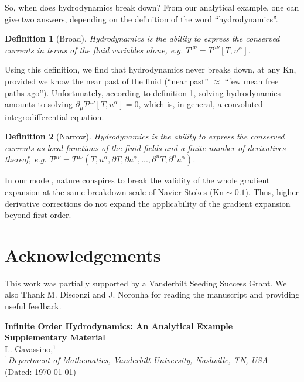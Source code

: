 \documentclass[a4paper, amsfonts, amssymb, amsmath, reprint, showkeys, twoside,notitlepage]{revtex4-2}
\newcommand{\Kn}{\text{Kn}}
\newtheorem{definition}{Definition}
\begin{document}
So, when does hydrodynamics break down? From our analytical example, one can give two answers, depending on the definition of the word ``hydrodynamics''.
\begin{definition}[Broad]\label{Broad}
Hydrodynamics is the ability to express the conserved currents in terms of the fluid variables alone, e.g. $T^{\mu \nu}=T^{\mu \nu}[T,u^\alpha]$.
\end{definition}
Using this definition, we find that hydrodynamics never breaks down, at any $\Kn$, provided we know the near past of the fluid (``near past'' $\approx$ ``few mean free paths ago''). Unfortunately, according to definition \ref{Broad}, solving hydrodynamics amounts to solving $\partial_\mu T^{\mu \nu}[T,u^\alpha]=0$, which is, in general, a convoluted integrodifferential equation. 
\begin{definition}[Narrow]\label{Narrow}
Hydrodynamics is the ability to express the conserved currents as local functions of the fluid fields and a finite number of derivatives thereof, e.g. $T^{\mu \nu}=T^{\mu \nu}(T,u^\alpha, \partial T, \partial u^\alpha,...,\partial^n T,\partial^n u^\alpha)$.
\end{definition}
In our model, nature conspires to break the validity of the whole gradient expansion at the same breakdown scale of Navier-Stokes ($\Kn \sim 0.1$). Thus, higher derivative corrections do not expand the applicability of the gradient expansion beyond first order. \\



\section*{Acknowledgements}
This work was partially supported by a Vanderbilt Seeding Success Grant. We also Thank M. Disconzi and J. Noronha for reading the manuscript and providing useful feedback.



\appendix










\newpage


\onecolumngrid
\newpage
\begin{center}
  \textbf{\large Infinite Order Hydrodynamics: An Analytical Example\\Supplementary Material}\\[.2cm]
  L. Gavassino,$^{1}$\\[.1cm]
  {\itshape ${}^1$Department of Mathematics, Vanderbilt University, Nashville, TN, USA\\}
(Dated: \today)\\[1cm]
\end{center}
\end{document}

